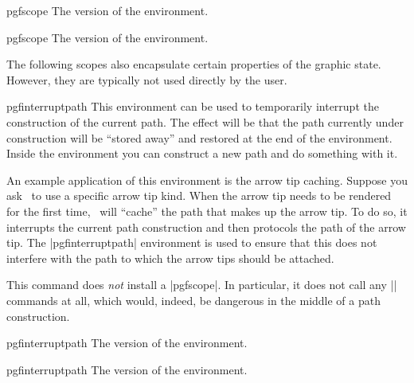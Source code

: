 \begin{plainenvironment}{{pgfscope}}
    The  version of the environment.
\end{plainenvironment}

\begin{contextenvironment}{{pgfscope}}
    The  version of the environment.
\end{contextenvironment}

The following scopes also encapsulate certain properties of the graphic state.
However, they are typically not used directly by the user.

\begin{environment}{{pgfinterruptpath}}
    This environment can be used to temporarily interrupt the construction of
    the current path. The effect will be that the path currently under
    construction will be ``stored away'' and restored at the end of the
    environment. Inside the environment you can construct a new path and do
    something with it.

    An example application of this environment is the arrow tip caching.
    Suppose you ask \pgfname\ to use a specific arrow tip kind. When the arrow
    tip needs to be rendered for the first time, \pgfname\ will ``cache'' the
    path that makes up the arrow tip. To do so, it interrupts the current path
    construction and then protocols the path of the arrow tip. The
    |{pgfinterruptpath}| environment is used to ensure that this does not
    interfere with the path to which the arrow tips should be attached.

    This command does \emph{not} install a |{pgfscope}|. In particular, it does
    not call any |\pgfsys@| commands at all, which would, indeed, be dangerous
    in the middle of a path construction.
\end{environment}

\begin{plainenvironment}{{pgfinterruptpath}}
    The  version of the environment.
\end{plainenvironment}

\begin{contextenvironment}{{pgfinterruptpath}}
    The  version of the environment.
\end{contextenvironment}


